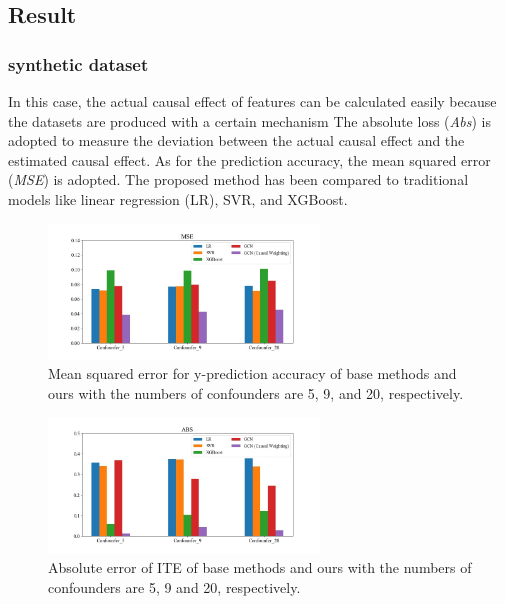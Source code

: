 \documentclass[sigconf,screen]{acmart}
\begin{document}
\subsection{Result}
\subsubsection{synthetic dataset}
In this case, the actual causal effect of features can be calculated easily because the datasets are produced with a certain mechanism The absolute loss (\textit{Abs}) is adopted to measure the deviation between the actual causal effect and the estimated causal effect. As for the prediction accuracy, the mean squared error (\textit{MSE}) is adopted. The proposed method has been compared to traditional models like linear regression (LR), SVR, and XGBoost. 
\begin{figure}[h]
\centering
\includegraphics[width=7.2cm]{Fig/MSE.jpg}
\caption{Mean squared error for y-prediction accuracy of base methods and ours with the numbers of confounders are 5, 9, and 20, respectively.}
\label{MSE_res}
\end{figure}

\begin{figure}[h]
\centering
\includegraphics[width=7.2cm]{Fig/ABS.jpg}
\caption{Absolute error of ITE of base methods and ours with the numbers of confounders are 5, 9 and 20, respectively.}
\label{ABS_res}
\end{figure}

\end{document}
